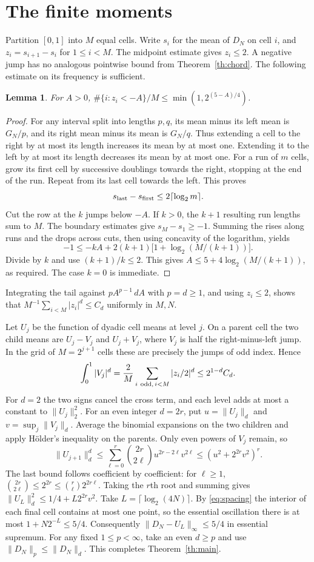 \documentclass[11pt,a4paper]{amsart}
\newtheorem{lemma}[theorem]{Lemma}
\newcommand{\norm}[1]{\lVert #1\rVert}
\begin{document}
\section{The finite moments}\label{sec:mom}
Partition $[0,1]$ into $M$ equal cells. Write $s_i$ for the mean of
$D_N$ on cell $i$, and $z_i=s_{i+1}-s_i$ for $1\le i<M$.
The midpoint estimate gives $z_i\le2$.
A negative jump has no analogous pointwise bound from
Theorem~\ref{th:chord}. The following estimate on its frequency is sufficient.
\begin{lemma}\label{lem:tail}
For $A>0$, $\#\{i:z_i<-A\}/M\le\min(1,2^{(5-A)/4})$.
\end{lemma}
\begin{proof}
For any interval split into lengths $p,q$, its mean minus its left
mean is $G_N/p$, and its right mean minus its mean is $G_N/q$.
Thus extending a cell to the right by at most its length increases its
mean by at most one. Extending it to the left by at most its length
decreases its mean by at most one. For a run of $m$ cells, grow its
first cell by successive doublings towards the right, stopping at the
end of the run. Repeat from its last cell towards the left. This proves
\[
 s_{\rm last}-s_{\rm first}\le 2\lceil\log_2 m\rceil .
\]
Cut the row at the $k$ jumps below $-A$. If $k>0$, the $k+1$ resulting
run lengths sum to $M$. The boundary estimates give $s_M-s_1\ge-1$.
Summing the rises along runs and the drops across cuts, then using
concavity of the logarithm, yields
\[
 -1\le-kA+2(k+1)\big[1+\log_2(M/(k+1))\big].
\]
Divide by $k$ and use $(k+1)/k\le2$. This gives
$A\le5+4\log_2(M/(k+1))$, as required. The case $k=0$ is immediate.
\end{proof}
Integrating the tail against $pA^{p-1}\,dA$ with $p=d\ge1$, and using $z_i\le2$,
shows that $M^{-1}\sum_{i<M}|z_i|^d\le C_d$ uniformly in $M,N$.

Let $U_j$ be the function of dyadic cell means at level $j$. On a
parent cell the two child means are $U_j-V_j$ and $U_j+V_j$, where
$V_j$ is half the right-minus-left jump. In the grid of $M=2^{j+1}$
cells these are precisely the jumps of odd index. Hence
\[
 \int_0^1 |V_j|^d=\frac{2}{M}\sum_{i\ {\rm odd},\,i<M}|z_i/2|^d
 \le 2^{1-d} C_d .
\]
For $d=2$ the two signs cancel the cross term, and each level adds
at most a constant to $\norm{U_j}_2^2$. For an even integer $d=2r$,
put $u=\norm{U_j}_d$ and $v=\sup_j\norm{V_j}_d$. Average the
binomial expansions on the two children and apply H\"older's inequality
on the parents. Only even powers of $V_j$ remain, so
\[
 \norm{U_{j+1}}_d^d
 \le\sum_{\ell=0}^r\binom{2r}{2\ell}u^{2r-2\ell}v^{2\ell}
 \le (u^2+2^{2r}v^2)^r .
\]
The last bound follows coefficient by coefficient: for $\ell\ge1$,
$\binom{2r}{2\ell}\le 2^{2r}\le\binom r\ell 2^{2r\ell}$.
Taking the $r$th root and summing gives
$\norm{U_L}_d^2\le1/4+L2^{2r}v^2$.
Take $L=\lceil\log_2(4N)\rceil$. By \eqref{eq:spacing} the interior
of each final cell contains at most one point, so the essential
oscillation there is at most $1+N2^{-L}\le5/4$.
Consequently $\norm{D_N-U_L}_\infty\le5/4$ in essential supremum.
For any fixed $1\le p<\infty$, take an even $d\ge p$ and use
$\norm{D_N}_p\le\norm{D_N}_d$. This completes Theorem~\ref{th:main}.
\end{document}
